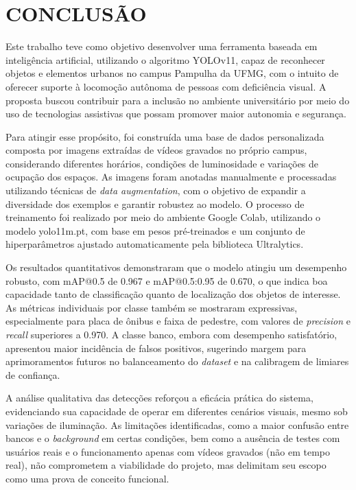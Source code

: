 \chapter{\textbf{CONCLUSÃO}}

Este trabalho teve como objetivo desenvolver uma ferramenta baseada em inteligência artificial, utilizando o algoritmo YOLOv11, capaz de reconhecer objetos e elementos urbanos no campus Pampulha da UFMG, com o intuito de oferecer suporte à locomoção autônoma de pessoas com deficiência visual. A proposta buscou contribuir para a inclusão no ambiente universitário por meio do uso de tecnologias assistivas que possam promover maior autonomia e segurança.

Para atingir esse propósito, foi construída uma base de dados personalizada composta por imagens extraídas de vídeos gravados no próprio campus, considerando diferentes horários, condições de luminosidade e variações de ocupação dos espaços. As imagens foram anotadas manualmente e processadas utilizando técnicas de \textit{data augmentation}, com o objetivo de expandir a diversidade dos exemplos e garantir robustez ao modelo. O processo de treinamento foi realizado por meio do ambiente Google Colab, utilizando o modelo yolo11m.pt, com base em pesos pré-treinados e um conjunto de hiperparâmetros ajustado automaticamente pela biblioteca Ultralytics.

Os resultados quantitativos demonstraram que o modelo atingiu um desempenho robusto, com mAP@0.5 de 0.967 e mAP@0.5:0.95 de 0.670, o que indica boa capacidade tanto de classificação quanto de localização dos objetos de interesse. As métricas individuais por classe também se mostraram expressivas, especialmente para placa de ônibus e faixa de pedestre, com valores de \textit{precision} e \textit{recall} superiores a 0.970. A classe banco, embora com desempenho satisfatório, apresentou maior incidência de falsos positivos, sugerindo margem para aprimoramentos futuros no balanceamento do \textit{dataset} e na calibragem de limiares de confiança.

A análise qualitativa das detecções reforçou a eficácia prática do sistema, evidenciando sua capacidade de operar em diferentes cenários visuais, mesmo sob variações de iluminação. As limitações identificadas, como a maior confusão entre bancos e o \textit{background} em certas condições, bem como a ausência de testes com usuários reais e o funcionamento apenas com vídeos gravados (não em tempo real), não comprometem a viabilidade do projeto, mas delimitam seu escopo como uma prova de conceito funcional.

